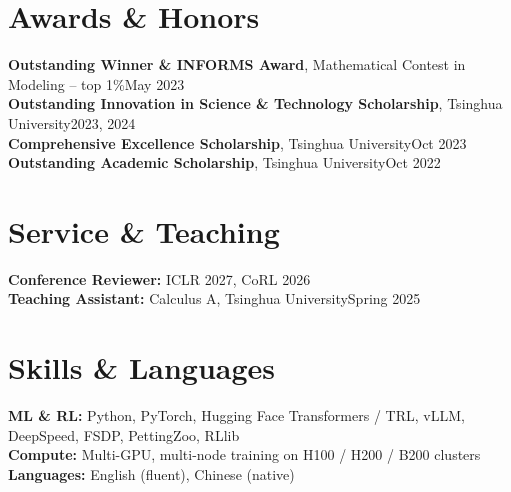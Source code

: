 \documentclass[10pt,letterpaper]{article}
\begin{document}
\section{Awards \& Honors}

\textbf{Outstanding Winner \& INFORMS Award}, Mathematical Contest in Modeling -- top 1\%\hfill May 2023\\
\textbf{Outstanding Innovation in Science \& Technology Scholarship}, Tsinghua University\hfill 2023, 2024\\
\textbf{Comprehensive Excellence Scholarship}, Tsinghua University\hfill Oct 2023\\
\textbf{Outstanding Academic Scholarship}, Tsinghua University\hfill Oct 2022

\section{Service \& Teaching}

\textbf{Conference Reviewer:} ICLR 2027, CoRL 2026\\
\textbf{Teaching Assistant:} Calculus A, Tsinghua University\hfill Spring 2025

\section{Skills \& Languages}

\textbf{ML \& RL:} Python, PyTorch, Hugging Face Transformers / TRL, vLLM, DeepSpeed, FSDP, PettingZoo, RLlib\\
\textbf{Compute:} Multi-GPU, multi-node training on H100 / H200 / B200 clusters\\
\textbf{Languages:} English (fluent), Chinese (native)
\end{document}
